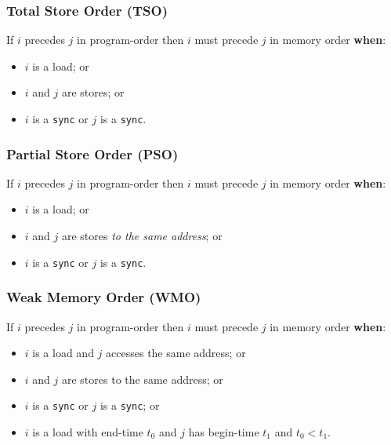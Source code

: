 \documentclass[11pt]{article}
\begin{document}
\subsubsection*{Total Store Order (TSO)}

If $i$ precedes $j$ in program-order then $i$ must precede
$j$ in memory order \textbf{when}:

\begin{itemize}
\item $i$ is a load; or
\item $i$ and $j$ are stores; or
\item $i$ is a \verb!sync! or $j$ is a \verb!sync!.
\end{itemize}

\subsubsection*{Partial Store Order (PSO)}

If $i$ precedes $j$ in program-order then $i$ must precede
$j$ in memory order \textbf{when}:

\begin{itemize}
\item $i$ is a load; or
\item $i$ and $j$ are stores \emph{to the same address}; or
\item $i$ is a \verb!sync! or $j$ is a \verb!sync!.
\end{itemize}

\subsubsection*{Weak Memory Order (WMO)}

If $i$ precedes $j$ in program-order then $i$ must precede
$j$ in memory order \textbf{when}:

\begin{itemize}

\item $i$ is a load and $j$ accesses the same address; or

\item $i$ and $j$ are stores to the same address; or

\item $i$ is a \verb!sync! or $j$ is a \verb!sync!; or

\item $i$ is a load with end-time $t_0$ and $j$ has begin-time
$t_1$ and $t_0 < t_1$.

\end{itemize}
\end{document}
